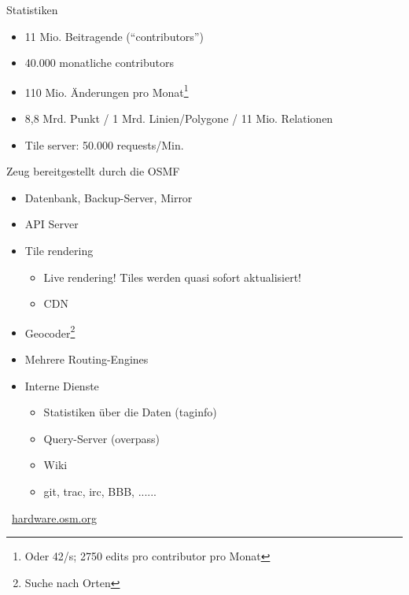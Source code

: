 \documentclass{beamer}
\begin{document}
			\begin{frame}{Statistiken}
				\begin{itemize}
					\item 11 Mio. Beitragende (\enquote{contributors})
					\item 40.000 monatliche contributors
					\item 110 Mio. Änderungen pro Monat\footnote{Oder 42/s; 2750 edits pro contributor pro Monat}
					\item 8,8 Mrd. Punkt / 1 Mrd. Linien/Polygone / 11 Mio. Relationen
					\item Tile server: 50.000 requests/Min.
				\end{itemize}
			\end{frame}
			
			\begin{frame}{Zeug bereitgestellt durch die OSMF}
				\begin{itemize}
					\item Datenbank, Backup-Server, Mirror
					\item API Server
					\item Tile rendering
					\begin{itemize}
						\item Live rendering! Tiles werden quasi sofort aktualisiert!
						\item CDN
					\end{itemize}
					\item Geocoder\footnote{Suche nach Orten}
					\item Mehrere Routing-Engines
					\item Interne Dienste
					\begin{itemize}
						\item Statistiken über die Daten (taginfo)
						\item Query-Server (overpass)
						\item Wiki
						\item git, trac, irc, BBB, ......
					\end{itemize}
				\end{itemize}
				\pause
				\textrightarrow\ \href{https://hardware.openstreetmap.org/}{hardware.osm.org}
			\end{frame}
			
\end{document}

